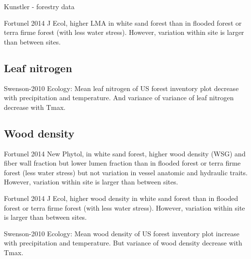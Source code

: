 \documentclass[a4paper,11pt]{article}
\begin{document}
Kunstler - forestry data


Fortunel 2014 J Ecol, higher LMA  in white sand forest than in flooded forest or terra firme forest (with less water stress). However, variation within site is larger than between sites.


\subsection{Leaf nitrogen}

Swenson-2010 Ecology: Mean leaf nitrogen of US forest inventory plot decrease with precipitation and temperature. And variance of variance of leaf nitrogen decrease with Tmax.


\subsection{Wood density}

Fortunel 2014 New Phytol, in white sand forest, higher wood density (WSG) and fiber wall fraction but lower lumen fraction than in flooded forest or terra firme forest (less water stress) but not variation in vessel anatomic and hydraulic traits. However, variation within site is larger than between sites.

Fortunel 2014 J Ecol, higher wood density in white sand forest than in flooded forest or terra firme forest (with less water stress). However, variation within site is larger than between sites.

Swenson-2010 Ecology: Mean wood density of US forest inventory plot increase with precipitation and temperature. But variance of wood density decrease with Tmax.


\clearpage



\end{document}

